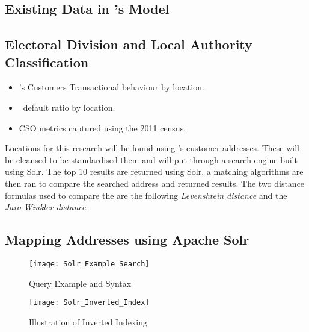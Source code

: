 \subsection{Existing Data in \subjectname's Model}

\subsection{Electoral Division and Local Authority Classification}
\begin{itemize}
	\item \subjectname's Customers Transactional behaviour by location.
	\item \subjectname\ default ratio by location.
	\item CSO metrics captured using the 2011 census. 
\end{itemize}

Locations for this research will be found using \subjectname's customer addresses. These will be cleansed to be standardised them and will put through a search engine built using Solr. The top 10 results are returned using Solr, a matching algorithms are then ran to compare the searched address and returned results. The two distance formulas used to compare the are the following \textit{Levenshtein distance} and the \textit{Jaro-Winkler distance}.

\subsection{Mapping Addresses using Apache Solr}


\begin{figure}[h!]
	\texttt{[image: Solr\_Example\_Search]}
	\caption[Query Example and Syntax]
	{Query Example and Syntax}
	\label{fig:Solr_Example_Search}
\end{figure}

\begin{figure}[h!]
	\texttt{[image: Solr\_Inverted\_Index]}
	\caption[Illustration of Inverted Indexing]
	{Illustration of Inverted Indexing}
	\label{fig:Solr_Inverted_Index}
\end{figure}

